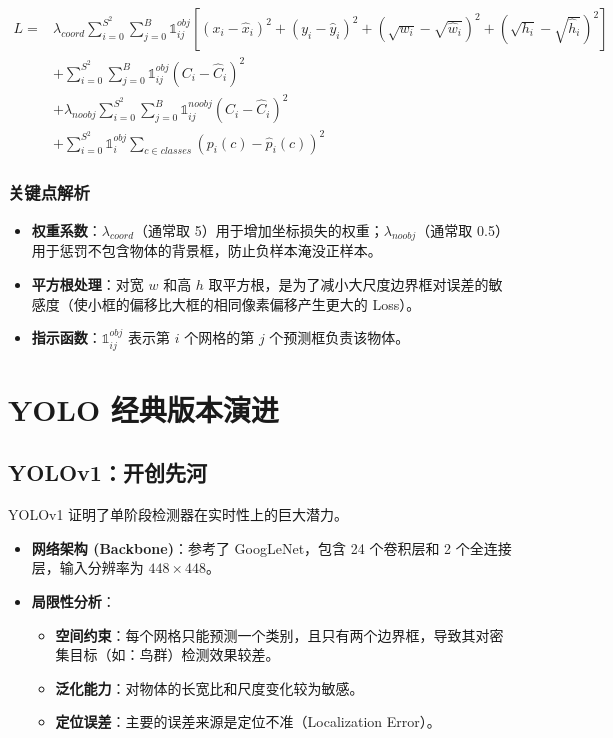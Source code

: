\documentclass[11pt,a4paper]{article}
\begin{document}
\begin{equation}
\begin{aligned}
L = & \lambda_{coord} \sum_{i=0}^{S^2} \sum_{j=0}^{B} \mathbb{1}_{ij}^{obj} \left[ (x_i - \hat{x}_i)^2 + (y_i - \hat{y}_i)^2 + (\sqrt{w_i} - \sqrt{\hat{w}_i})^2 + (\sqrt{h_i} - \sqrt{\hat{h}_i})^2 \right] \\
& + \sum_{i=0}^{S^2} \sum_{j=0}^{B} \mathbb{1}_{ij}^{obj} (C_i - \hat{C}_i)^2 \\
& + \lambda_{noobj} \sum_{i=0}^{S^2} \sum_{j=0}^{B} \mathbb{1}_{ij}^{noobj} (C_i - \hat{C}_i)^2 \\
& + \sum_{i=0}^{S^2} \mathbb{1}_{i}^{obj} \sum_{c \in classes} (p_i(c) - \hat{p}_i(c))^2
\end{aligned}
\end{equation}

\subsubsection{关键点解析}
\begin{itemize}
    \item \textbf{权重系数}：$\lambda_{coord}$（通常取 5）用于增加坐标损失的权重；$\lambda_{noobj}$（通常取 0.5）用于惩罚不包含物体的背景框，防止负样本淹没正样本。
    \item \textbf{平方根处理}：对宽 $w$ 和高 $h$ 取平方根，是为了减小大尺度边界框对误差的敏感度（使小框的偏移比大框的相同像素偏移产生更大的 Loss）。
    \item \textbf{指示函数}：$\mathbb{1}_{ij}^{obj}$ 表示第 $i$ 个网格的第 $j$ 个预测框负责该物体。
\end{itemize}



\section{YOLO 经典版本演进}

\subsection{YOLOv1：开创先河}
YOLOv1 证明了单阶段检测器在实时性上的巨大潜力。
\begin{itemize}
    \item \textbf{网络架构 (Backbone)}：参考了 GoogLeNet，包含 24 个卷积层和 2 个全连接层，输入分辨率为 $448 \times 448$。
    \item \textbf{局限性分析}：
    \begin{itemize}
        \item \textbf{空间约束}：每个网格只能预测一个类别，且只有两个边界框，导致其对密集目标（如：鸟群）检测效果较差。
        \item \textbf{泛化能力}：对物体的长宽比和尺度变化较为敏感。
        \item \textbf{定位误差}：主要的误差来源是定位不准（Localization Error）。
    \end{itemize}
\end{itemize}
\end{document}
